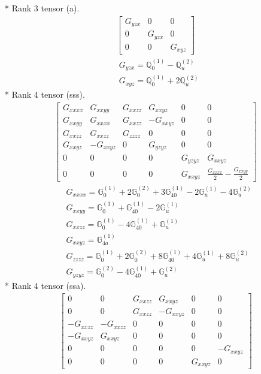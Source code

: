 \documentclass[fleqn,8pt,landscape]{jsarticle}
\begin{document}
* Rank 3 tensor (a).
\begin{align*}
\begin{bmatrix} G_{yzx} & 0 & 0 \\ 0 & G_{yzx} & 0 \\ 0 & 0 & G_{xyz} \end{bmatrix}
\end{align*}
\begin{align*}
& G_{yzx} = \mathbb{Q}_{0}^{(1)} - \mathbb{Q}_{u}^{(2)} \\
& G_{xyz} = \mathbb{Q}_{0}^{(1)} + 2 \mathbb{Q}_{u}^{(2)}
\end{align*}
* Rank 4 tensor (sss).
\begin{align*}
\begin{bmatrix} G_{xxxx} & G_{xxyy} & G_{xxzz} & G_{xxyz} & 0 & 0 \\ G_{xxyy} & G_{xxxx} & G_{xxzz} & - G_{xxyz} & 0 & 0 \\ G_{xxzz} & G_{xxzz} & G_{zzzz} & 0 & 0 & 0 \\ G_{xxyz} & - G_{xxyz} & 0 & G_{yzyz} & 0 & 0 \\ 0 & 0 & 0 & 0 & G_{yzyz} & G_{xxyz} \\ 0 & 0 & 0 & 0 & G_{xxyz} & \frac{G_{xxxx}}{2} - \frac{G_{xxyy}}{2} \end{bmatrix}
\end{align*}
\begin{align*}
& G_{xxxx} = \mathbb{G}_{0}^{(1)} + 2 \mathbb{G}_{0}^{(2)} + 3 \mathbb{G}_{40}^{(1)} - 2 \mathbb{G}_{u}^{(1)} - 4 \mathbb{G}_{u}^{(2)} \\
& G_{xxyy} = \mathbb{G}_{0}^{(1)} + \mathbb{G}_{40}^{(1)} - 2 \mathbb{G}_{u}^{(1)} \\
& G_{xxzz} = \mathbb{G}_{0}^{(1)} - 4 \mathbb{G}_{40}^{(1)} + \mathbb{G}_{u}^{(1)} \\
& G_{xxyz} = \mathbb{G}_{4a}^{(1)} \\
& G_{zzzz} = \mathbb{G}_{0}^{(1)} + 2 \mathbb{G}_{0}^{(2)} + 8 \mathbb{G}_{40}^{(1)} + 4 \mathbb{G}_{u}^{(1)} + 8 \mathbb{G}_{u}^{(2)} \\
& G_{yzyz} = \mathbb{G}_{0}^{(2)} - 4 \mathbb{G}_{40}^{(1)} + \mathbb{G}_{u}^{(2)}
\end{align*}
* Rank 4 tensor (ssa).
\begin{align*}
\begin{bmatrix} 0 & 0 & G_{xxzz} & G_{xxyz} & 0 & 0 \\ 0 & 0 & G_{xxzz} & - G_{xxyz} & 0 & 0 \\ - G_{xxzz} & - G_{xxzz} & 0 & 0 & 0 & 0 \\ - G_{xxyz} & G_{xxyz} & 0 & 0 & 0 & 0 \\ 0 & 0 & 0 & 0 & 0 & - G_{xxyz} \\ 0 & 0 & 0 & 0 & G_{xxyz} & 0 \end{bmatrix}
\end{align*}
\end{document}
